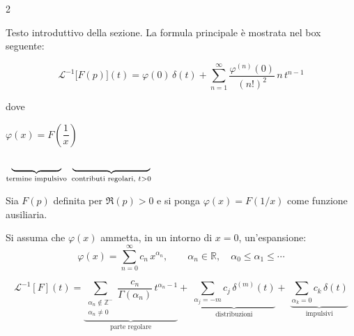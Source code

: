 \documentclass[a3paper, 12pt]{article}
\newcommand{\sectionnum}[1]{%
  \tikz[baseline=-0.5ex]\node[fill=accentBlue, text=white,
    font=\bfseries\small, inner sep=3pt, rounded corners=2pt]{#1};%
}
\begin{document}
\begin{multicols}{2}

\begin{tcolorbox}[sectionbox,
  title={\sectionnum{2.1}\quad CASO SPECIALE: SERIE INTERA}]

Testo introduttivo della sezione. La formula principale
è mostrata nel box seguente:

\begin{tcolorbox}[formulabox]
\[
  \mathcal{L}^{-1}\bigl[F(p)\bigr](t)
  = \varphi(0)\,\delta(t)
    + \sum_{n=1}^{\infty}
      \frac{\varphi^{(n)}(0)}{(n!)^2}\,n\,t^{n-1}
\]
\end{tcolorbox}

\vspace{4pt}
dove \quad
\begin{tcolorbox}[notebox, width=0.45\linewidth]
$\varphi(x) = F\!\left(\dfrac{1}{x}\right)$
\end{tcolorbox}

\vspace{4pt}
\textcolor{textMuted}{\small
  \(\underbrace{\hspace{1.8cm}}_{\text{termine impulsivo}}\)
  \hspace{0.3cm}
  \(\underbrace{\hspace{2.8cm}}_{\text{contributi regolari, } t>0}\)
}

\end{tcolorbox}

\vspace{0.3cm}

\begin{tcolorbox}[sectionbox,
  title={\sectionnum{2.2}\quad ESTENSIONE GENERALE}]

Sia $F(p)$ definita per $\Re(p)>0$ e si ponga
$\varphi(x)=F(1/x)$ come funzione ausiliaria.

Si assuma che $\varphi(x)$ ammetta, in un intorno di $x=0$,
un'espansione:
\[
  \varphi(x) = \sum_{n=0}^{\infty} c_n\, x^{\alpha_n}, \qquad
  \alpha_n \in \mathbb{R},\quad \alpha_0 \le \alpha_1 \le \cdots
\]

\begin{tcolorbox}[formulabox]
\[
  \mathcal{L}^{-1}[F](t)
  = \underbrace{
      \sum_{\substack{\alpha_n \notin \mathbb{Z}^- \\ \alpha_n \ne 0}}
      \!\!\frac{c_n}{\Gamma(\alpha_n)}\,t^{\alpha_n - 1}
    }_{\text{parte regolare}}
  +\; \underbrace{
      \sum_{\alpha_j = -m} c_j\,\delta^{(m)}(t)
    }_{\text{distribuzioni}}
  +\; \underbrace{
      \sum_{\alpha_k = 0} c_k\,\delta(t)
    }_{\text{impulsivi}}
\]
\end{tcolorbox}


\end{tcolorbox}
\end{multicols}
\end{document}
